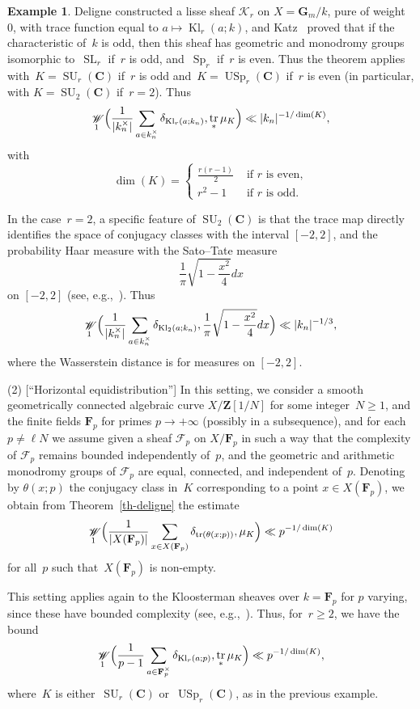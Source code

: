 \documentclass[12pt]{amsart}
\renewcommand{\mathcal}{\mathscr}
\renewcommand{\geq}{\geqslant}
\newcommand{\Cc}{\mathbf{C}}
\newcommand{\Zz}{\mathbf{Z}}
\newcommand{\Gg}{\mathbf{G}}
\newcommand{\Ff}{\mathbf{F}}
\DeclareMathOperator{\Kl}{Kl}
\DeclareMathOperator{\wass}{\mathcal{W}}
\DeclareMathOperator{\Tr}{tr}
\DeclareMathOperator{\SL}{SL}
\DeclareMathOperator{\Sp}{Sp}
\DeclareMathOperator{\SU}{SU}
\DeclareMathOperator{\USp}{USp}
\theoremstyle{plain}
\theoremstyle{remark}
\theoremstyle{definition}
\newtheorem{example}[theorem]{Example}
\renewcommand{\geq}{\geqslant}
\begin{document}
\begin{example}
  Deligne constructed a lisse sheaf $\mathcal{K}_r$ on $X=\Gg_m/k$, pure
  of weight~$0$, with trace function equal to $a\mapsto \Kl_r(a;k)$, and
  Katz~\cite[Th.\,11.1]{gkm} proved that if the characteristic of~$k$ is
  odd, then this sheaf has geometric and monodromy groups isomorphic
  to~$\SL_r$ if~$r$ is odd, and~$\Sp_{r}$ if~$r$ is even. Thus the
  theorem applies with~$K=\SU_r(\Cc)$ if~$r$ is odd
  and~$K=\USp_{r}(\Cc)$ if~$r$ is even (in particular, with
  $K=\SU_2(\Cc)$ if~$r=2$).  Thus
  \[
    \wass_1\Bigl(\frac{1}{|k_n^{\times}|}\sum_{a\in k_n^{\times}}
    \delta_{\Kl_r(a;k_n)},\Tr_*\mu_K\Bigr) \ll |k_n|^{-1/\dim(K)},
  \]
  with
  \[
    \dim(K)=\begin{cases}
      \frac{r(r-1)}{2}&\text{ if $r$ is even},\\
      r^2-1&\text{ if $r$ is odd.}
    \end{cases}
  \]

  In the case~$r=2$, a specific feature of $\SU_2(\Cc)$ is that the
  trace map directly identifies the space of conjugacy classes with
  the interval $[-2,2]$, and the probability Haar measure with the
  Sato--Tate measure
  \[
    \frac{1}{\pi}\sqrt{1-\frac{x^2}{4}}dx
  \]
  on $[-2,2]$ (see, e.g.,~\cite[p.\,58,\,exemple]{lie9}).  Thus
  \[
    \wass_1\Bigl(\frac{1}{|k_n^{\times}|}\sum_{a\in k_n^{\times}}
    \delta_{\Kl_2(a;k_n)},\frac{1}{\pi}\sqrt{1-\frac{x^2}{4}}dx\Bigr)
    \ll |k_n|^{-1/3},
  \]
  where the Wasserstein distance is for measures on $[-2,2]$.

  (2) [``Horizontal equidistribution''] In this setting, we consider a
  smooth geometrically connected algebraic curve $X/\Zz[1/N]$ for some
  integer~$N\geq 1$, and the finite fields $\Ff_p$ for primes
  $p\to +\infty$ (possibly in a subsequence), and for each
  $p\not=\ell N$ we assume given a sheaf $\mathcal{F}_{p}$ on $X/\Ff_p$
  in such a way that the complexity of $\mathcal{F}_p$ remains bounded
  independently of~$p$, and the geometric and arithmetic monodromy
  groups of $\mathcal{F}_p$ are equal, connected, and independent
  of~$p$. Denoting by $\theta(x;p)$ the conjugacy class in~$K$
  corresponding to a point $x\in X(\Ff_p)$, we obtain from
  Theorem~\ref{th-deligne} the estimate
  \[
    \wass_1\Bigl(\frac{1}{|X(\Ff_p)|}\sum_{x\in X(\Ff_p)}
    \delta_{\Tr(\theta(x;p))},\mu_K\Bigr) \ll p^{-1/\dim(K)}
  \]
  for all~$p$ such that~$X(\Ff_p)$ is non-empty.
  
  This setting applies again to the Kloosterman sheaves over $k=\Ff_p$
  for $p$ varying, since these have bounded complexity (see,
  e.g.,~\cite[Prop.\,7.8,\,(1)]{sffk}). Thus, for~$r\geq 2$, we have
  the bound
  \[
    \wass_1\Bigl(\frac{1}{p-1}\sum_{a\in \Ff_p^{\times}}
    \delta_{\Kl_r(a;p)},\Tr_*\mu_K\Bigr) \ll p^{-1/\dim(K)},
  \]
  where~$K$ is either~$\SU_r(\Cc)$ or~$\USp_r(\Cc)$, as in the
  previous example.


\end{example}
\end{document}
